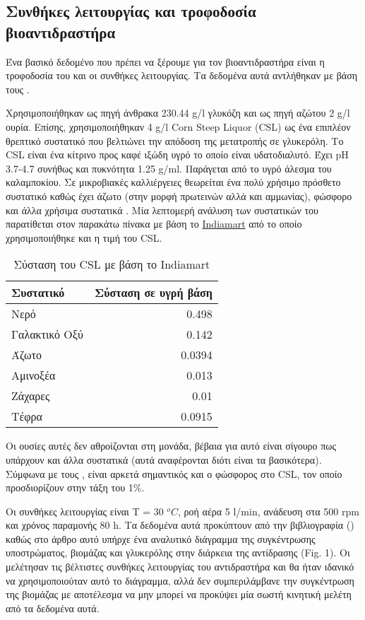 \documentclass[11pt]{article}
\begin{document}
\subsection{Συνθήκες λειτουργίας και τροφοδοσία βιοαντιδραστήρα}
\label{sec:org9900f56}
Ένα βασικό δεδομένο που πρέπει να ξέρουμε για τον βιοαντιδραστήρα είναι η τροφοδοσία του και οι συνθήκες λειτουργίας. Τα δεδομένα αυτά αντλήθηκαν με βάση τους \cite{zhugeGlycerolProductionNovel2001,jinByproductFormationNovel2003} .

Χρησιμοποιήθηκαν ως πηγή άνθρακα 230.44 g/l γλυκόζη και ως πηγή αζώτου 2 g/l ουρία. Επίσης, χρησιμοποιήθηκαν 4 g/l Corn Steep Liquor (CSL) ως ένα επιπλέον θρεπτικό συστατικό που βελτιώνει την απόδοση της μετατροπής σε γλυκερόλη. Το CSL είναι ένα κίτρινο προς καφέ ιξώδη υγρό το οποίο είναι υδατοδιαλυτό. Έχει pH 3.7-4.7 συνήθως και πυκνότητα 1.25 g/ml. Παράγεται από το υγρό άλεσμα του καλαμποκίου. Σε μικροβιακές καλλιέργειες θεωρείται ένα πολύ χρήσιμο πρόσθετο συστατικό καθώς έχει άζωτο (στην μορφή πρωτεινών αλλά και αμμωνίας), φώσφορο και άλλα χρήσιμα συστατικά  \cite{liggettCORNSTEEPLIQUOR}. Μία λεπτομερή ανάλυση των συστατικών του παρατίθεται στον παρακάτω πίνακα με βάση το \href{https://www.indiamart.com/proddetail/corn-steep-liquor-15744963191.html}{Indiamart} από το οποίο χρησιμοποιήθηκε και η τιμή του CSL.

\begin{table}[htbp]
\caption{Σύσταση του CSL με βάση το Indiamart}
\centering
\begin{tabular}{lr}
Συστατικό & Σύσταση σε υγρή βάση\\
\hline
Νερό & 0.498\\
Γαλακτικό Οξύ & 0.142\\
Άζωτο & 0.0394\\
Αμινοξέα & 0.013\\
Ζάχαρες & 0.01\\
Τέφρα & 0.0915\\
\end{tabular}
\end{table}

Οι ουσίες αυτές δεν αθροίζονται στη μονάδα, βέβαια για αυτό είναι σίγουρο πως υπάρχουν και άλλα συστατικά (αυτά αναφέρονται διότι είναι τα βασικότερα). Σύμφωνα με τους \cite{zhugeGlycerolProductionNovel2001}, είναι αρκετά σημαντικός και ο φώσφορος στο CSL, τον οποίο προσδιορίζουν στην τάξη του 1\%. 

Οι συνθήκες λειτουργίας είναι T = 30 \(^oC\), ροή αέρα 5 l/min, ανάδευση στα 500 rpm και χρόνος παραμονής 80 h. Τα δεδομένα αυτά προκύπτουν από την βιβλιογραφία (\cite{jinByproductFormationNovel2003}) καθώς στο άρθρο αυτό υπήρχε ένα αναλυτικό διάγραμμα της συγκέντρωσης υποστρώματος, βιομάζας και γλυκερόλης στην διάρκεια της αντίδρασης (Fig. 1). Οι \cite{zhugeGlycerolProductionNovel2001} μελέτησαν τις βέλτιστες συνθήκες λειτουργίας του αντιδραστήρα και θα ήταν ιδανικό να χρησιμοποιούταν αυτό το διάγραμμα, αλλά δεν συμπεριλάμβανε την συγκέντρωση της βιομάζας με αποτέλεσμα να μην μπορεί να προκύψει μία σωστή κινητική μελέτη από τα δεδομένα αυτά.
\end{document}
